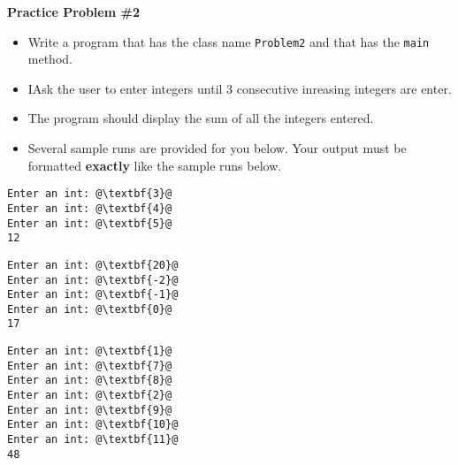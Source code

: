 \documentclass[12pt]{article}
\begin{document}
\vspace*{0.5cm}
\noindent\textbf{Practice Problem \#2}
\begin{itemize}
	\item Write a program that has the class name \texttt{Problem2} and that has the \texttt{main} method.
	\item IAsk the user to enter integers until 3 consecutive inreasing integers are enter.
	\item The program should display the sum of all the integers entered.
	\item Several sample runs are provided for you below. Your output must be formatted \textbf{exactly} like the sample runs below.
\end{itemize}
\begin{center}
\begin{minipage}{3cm}
\begin{lstlisting}[escapechar=@]
Enter an int: @\textbf{3}@
Enter an int: @\textbf{4}@
Enter an int: @\textbf{5}@
12
\end{lstlisting}
\end{minipage}
\hspace*{.5cm}
\begin{minipage}{3cm}
\begin{lstlisting}[escapechar=@]
Enter an int: @\textbf{20}@
Enter an int: @\textbf{-2}@
Enter an int: @\textbf{-1}@
Enter an int: @\textbf{0}@
17
\end{lstlisting}

\end{minipage}
\hspace*{.5cm}
\begin{minipage}{3cm}
\begin{lstlisting}[escapechar=@]
Enter an int: @\textbf{1}@
Enter an int: @\textbf{7}@
Enter an int: @\textbf{8}@
Enter an int: @\textbf{2}@
Enter an int: @\textbf{9}@
Enter an int: @\textbf{10}@
Enter an int: @\textbf{11}@
48
\end{lstlisting}

\end{minipage}\\


\end{center}

\vspace*{0.5cm}
\end{document}
